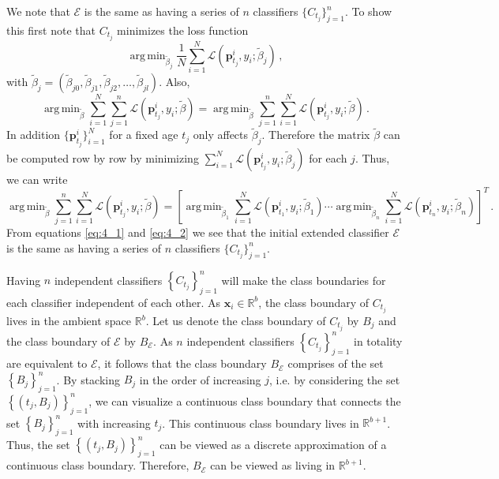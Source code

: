\documentclass[a4paper,11pt]{article}
\DeclareMathOperator*{\argmin}{arg\,min}
\begin{document}
We note that $\mathscr{E}$ is the same as having a series of $n$ classifiers $\{C_{t_j}\}_{j=1}^n $. To show this first note that $C_{t_j} $ minimizes the loss function
$$
  \argmin_{\tilde{\beta}_j} \frac{1}{N} \sum_{i=1}^N \mathscr{L} \left( \bm{p}^i_{t_j},y_i;\tilde{\beta}_j \right) \, ,
$$
with $\tilde{\beta}_j = \left( \tilde{\beta}_{j0}, \tilde{\beta}_{j1}, \tilde{\beta}_{j2}, \dots, \tilde{\beta}_{jl} \right)$. Also,
\begin{equation}\label{eq:4_1}
	\argmin_{\tilde{\beta}} \sum_{i=1}^N \sum_{j=1}^n \mathscr{L} \left( \bm{p}^i_{t_j},y_i;\tilde{\beta} \right) = \argmin_{\tilde{\beta}} \sum_{j=1}^n \sum_{i=1}^N \mathscr{L} \left( \bm{p}^i_{t_j},y_i;\tilde{\beta} \right) \, .
\end{equation}
In addition $\{\bm{p}^i_{t_j}\}_{i=1}^N$ for a fixed age $t_j$ only affects $\tilde{\beta}_j$. Therefore the matrix $\tilde{\beta} $ can be computed row by row by minimizing $\sum_{i=1}^N \mathscr{L} \left( \bm{p}^i_{t_j},y_i;\tilde{\beta}_j \right)$ for each $j$. Thus, we can write
\begin{equation}\label{eq:4_2}
	\argmin_{\tilde{\beta}} \sum_{j=1}^n \sum_{i=1}^N \mathscr{L} \left( \bm{p}^i_{t_j},y_i;\tilde{\beta} \right) = \left[\argmin_{\tilde{\beta}_1} \sum_{i=1}^N \mathscr{L} \left( \bm{p}^i_{t_1},y_i;\tilde{\beta}_1 \right) \cdots \argmin_{\tilde{\beta}_n} \sum_{i=1}^N \mathscr{L} \left( \bm{p}^i_{t_n},y_i;\tilde{\beta}_n \right) \right]^T \, .
\end{equation}
From equations \eqref{eq:4_1} and \eqref{eq:4_2} we see that the initial extended classifier $\mathscr{E}$ is the same as having a series of $n$ classifiers $\{C_{t_j}\}_{j=1}^n $.

Having $n$ independent classifiers $\left\{C_{t_j}\right\}_{j=1}^n $ will make the class boundaries for each classifier independent of each other. As $\bm{x}_i \in \mathbb{R}^b$, the class boundary of $C_{t_j} $ lives in the ambient space $\mathbb{R}^{b}$. Let us denote the class boundary of $C_{t_j}$ by $B_j$ and the class boundary of $\mathscr{E}$ by $B_{\mathscr{E}}$. As $n$ independent classifiers $\left \{C_{t_j} \right \}_{j=1}^n $ in totality are equivalent to $\mathscr{E}$, it follows that the class boundary $ B_{\mathscr{E}} $ comprises of the set $\left\{ B_j \right\}_{j=1}^n $. By stacking $ B_j $ in the order of increasing $j$, i.e. by considering the set $\left \{ \left(t_j, B_j \right) \right \}_{j=1}^n $, we can visualize a continuous class boundary that connects the set $\left\{ B_j \right\}_{j=1}^n $ with increasing $t_j$. This continuous class boundary lives in $\mathbb{R}^{b+1}$. Thus, the set $\left \{ \left(t_j, B_j \right) \right \}_{j=1}^n $ can be viewed as a discrete approximation of a continuous class boundary. Therefore, $B_{\mathscr{E}}$ can be viewed as living in $\mathbb{R}^{b+1}$.
\end{document}

